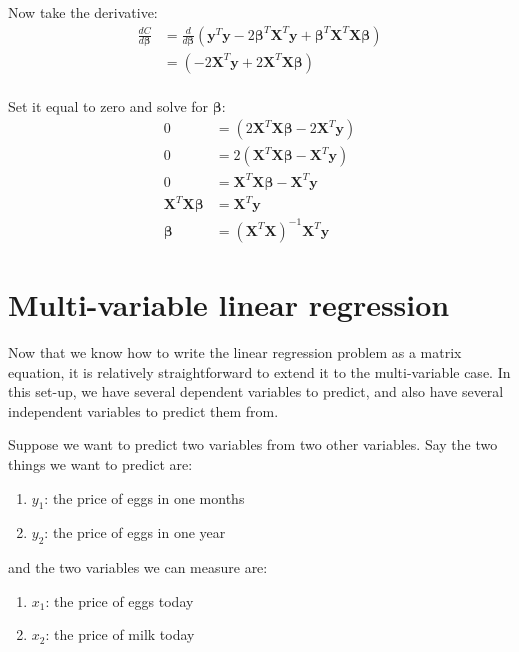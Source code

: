 \documentclass[11pt]{article}
\newcommand\xmtx{\boldsymbol{X}}
\newcommand\betavec{\boldsymbol{\beta}}
\newcommand\yvec{\boldsymbol{y}}
\begin{document}
Now take the derivative:
\begin{equation}
    \begin{aligned}
        \frac{dC}{d\betavec} &= \frac{d}{d\betavec} 
            (\yvec^T \yvec  - 2 \betavec^T \xmtx^T \yvec + \betavec^T \xmtx^T \xmtx \betavec )\\
            &= (- 2 \xmtx^T \yvec + 2 \xmtx^T \xmtx \betavec )\\
    \end{aligned}
\end{equation}

Set it equal to zero and solve for $\betavec$:
\begin{equation}
    \begin{aligned}
        0 &= (2 \xmtx^T \xmtx \betavec - 2 \xmtx^T \yvec  ) \\
        0 &= 2( \xmtx^T \xmtx \betavec -\xmtx^T \yvec) \\
        0 &=  \xmtx^T \xmtx \betavec -\xmtx^T \yvec \\
        \xmtx^T \xmtx \betavec & = \xmtx^T \yvec \\
        \betavec &= (\xmtx^T \xmtx )^{-1} \xmtx^T \yvec 
    \end{aligned}
\end{equation}


\section{ Multi-variable linear regression }

Now that we know how to write the linear regression problem as a matrix
equation, it is relatively straightforward to extend it to the
multi-variable case. In this set-up, we have several dependent variables to
predict, and also have several independent variables to predict them
from.

Suppose we want to predict two variables from two other variables.
Say the two things we want to predict are:
\begin{enumerate}
    \item $y_1$: the price of eggs in one months
    \item $y_2$: the price of eggs in one year
\end{enumerate}
and the two variables we can measure are:
\begin{enumerate}
    \item $x_1$: the price of eggs today
    \item $x_2$: the price of milk today
\end{enumerate}
\end{document}
